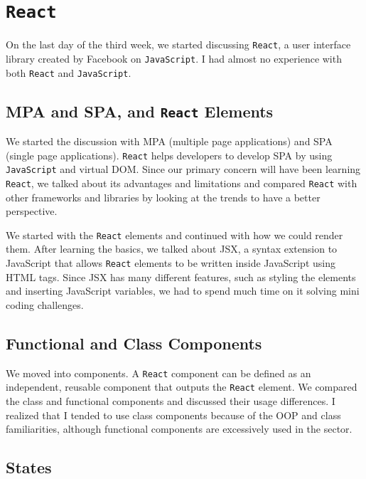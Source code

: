 \section{\texttt{React}}

On the last day of the third week, we started discussing \texttt{React}, a user interface library created by Facebook on \texttt{JavaScript}. I had almost no experience with both \texttt{React} and \texttt{JavaScript}. 

\subsection{MPA and SPA, and \texttt{React} Elements}

We started the discussion with MPA (multiple page applications) and SPA (single page applications). \texttt{React} helps developers to develop SPA by using \texttt{JavaScript} and virtual DOM. Since our primary concern will have been learning \texttt{React}, we talked about its advantages and limitations and compared \texttt{React} with other frameworks and libraries by looking at the trends to have a better perspective.

We started with the \texttt{React} elements and continued with how we could render them. After learning the basics, we talked about JSX, a syntax extension to JavaScript that allows \texttt{React} elements to be written inside JavaScript using HTML tags. Since JSX has many different features, such as styling the elements and inserting JavaScript variables, we had to spend much time on it solving mini coding challenges.

\subsection{Functional and Class Components}

We moved into components. A \texttt{React} component can be defined as an independent, reusable component that outputs the \texttt{React} element. We compared the class and functional components and discussed their usage differences. I realized that I tended to use class components because of the OOP and class familiarities, although functional components are excessively used in the sector.

\subsection{States}

